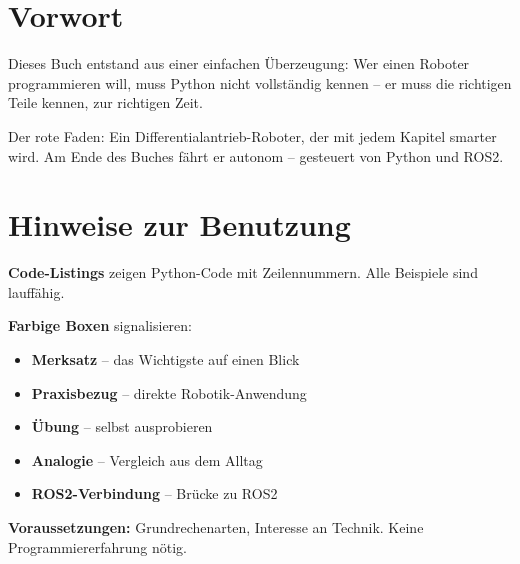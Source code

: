 \chapter*{Vorwort}
Dieses Buch entstand aus einer einfachen Überzeugung: Wer einen Roboter programmieren will, muss Python nicht vollständig kennen -- er muss die richtigen Teile kennen, zur richtigen Zeit.

Der rote Faden: Ein Differentialantrieb-Roboter, der mit jedem Kapitel smarter wird. Am Ende des Buches fährt er autonom -- gesteuert von Python und ROS2.


\chapter*{Hinweise zur Benutzung}

\textbf{Code-Listings} zeigen Python-Code mit Zeilennummern. Alle Beispiele sind lauffähig.

\textbf{Farbige Boxen} signalisieren:
\begin{itemize}
    \item \textcolor{blue!70!black}{\textbf{Merksatz}} -- das Wichtigste auf einen Blick
    \item \textcolor{green!60!black}{\textbf{Praxisbezug}} -- direkte Robotik-Anwendung
    \item \textcolor{orange!80!black}{\textbf{Übung}} -- selbst ausprobieren
    \item \textcolor{purple!60!black}{\textbf{Analogie}} -- Vergleich aus dem Alltag
    \item \textcolor{red!70!black}{\textbf{ROS2-Verbindung}} -- Brücke zu ROS2
\end{itemize}

\textbf{Voraussetzungen:} Grundrechenarten, Interesse an Technik. Keine Programmiererfahrung nötig.
